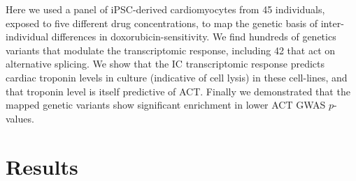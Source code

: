\documentclass[9pt,lineno]{elife}
\begin{document}
Here we used a panel of iPSC-derived cardiomyocytes from 45 individuals, exposed to five different drug concentrations, to map the genetic basis of inter-individual differences in doxorubicin-sensitivity. We find hundreds of genetics variants that modulate the  transcriptomic response, including 42 that act on alternative splicing. We show that the IC transcriptomic response predicts cardiac troponin levels in culture (indicative of cell lysis) in these cell-lines, and that troponin level is itself predictive of ACT. Finally we demonstrated that the mapped genetic variants show significant enrichment in lower ACT GWAS $p$-values. 

\section*{Results}
\end{document}
